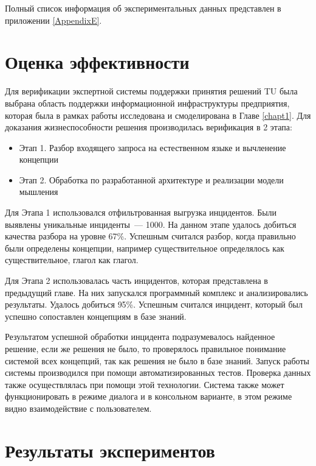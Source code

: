 Полный список информация об экспериментальных данных представлен в приложении \ref{AppendixE}.




\section{Оценка эффективности}
Для верификации экспертной системы поддержки принятия решений TU была выбрана область поддержки информационной инфраструктуры предприятия, которая была в рамках работы исследована и смоделирована в Главе \ref{chapt1}. 
Для доказания жизнеспособности решения производилась верификация в 2 этапа:
\begin{itemize}
	\item Этап 1. Разбор входящего запроса на естественном языке и вычленение концепции
	\item Этап 2. Обработка по разработанной архитектуре и реализации модели мышления  
\end{itemize} \par
Для Этапа 1 использовался отфильтрованная выгрузка инцидентов. Были выявлены уникальные инциденты~--- 1000. На данном этапе удалось добиться качества разбора на уровне 67\%. Успешным считался разбор, когда правильно были определены концепции, например существительное определялось как существительное, глагол как глагол. \par
Для Этапа 2 использовалась часть инцидентов, которая представлена в предыдущий главе. На них запускался программный комплекс и анализировались результаты. Удалось добиться 95\%. Успешным считался инцидент, который был успешно сопоставлен концепциям в базе знаний. \par
Результатом успешной обработки инцидента подразумевалось найденное решение, если же решения не было, то проверялось правильное понимание системой всех концепций, так как решения не было в базе знаний. Запуск работы системы производился при помощи автоматизированных тестов. Проверка данных также осуществлялась при помощи этой технологии. Система также может функционировать в режиме диалога и в консольном варианте, в этом режиме видно взаимодействие с пользователем. 



\section{Результаты экспериментов}

